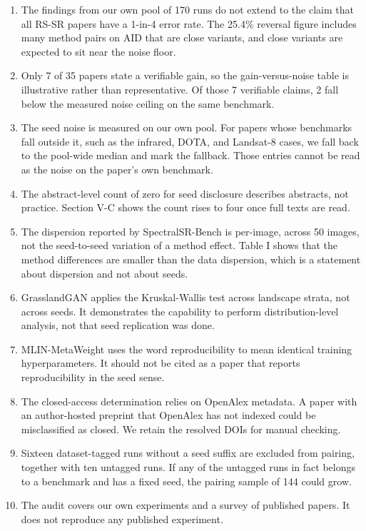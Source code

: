\documentclass[journal,twoside,10pt]{IEEEtran}
\begin{document}
\begin{enumerate}
\item The findings from our own pool of 170 runs do not extend to the claim that all RS-SR papers have a 1-in-4 error rate. The 25.4\% reversal figure includes many method pairs on AID that are close variants, and close variants are expected to sit near the noise floor.
\item Only 7 of 35 papers state a verifiable gain, so the gain-versus-noise table is illustrative rather than representative. Of those 7 verifiable claims, 2 fall below the measured noise ceiling on the same benchmark.
\item The seed noise is measured on our own pool. For papers whose benchmarks fall outside it, such as the infrared, DOTA, and Landsat-8 cases, we fall back to the pool-wide median and mark the fallback. Those entries cannot be read as the noise on the paper's own benchmark.
\item The abstract-level count of zero for seed disclosure describes abstracts, not practice. Section V-C shows the count rises to four once full texts are read.
\item The dispersion reported by SpectralSR-Bench is per-image, across 50 images, not the seed-to-seed variation of a method effect. Table I shows that the method differences are smaller than the data dispersion, which is a statement about dispersion and not about seeds.
\item GrasslandGAN applies the Kruskal-Wallis test across landscape strata, not across seeds. It demonstrates the capability to perform distribution-level analysis, not that seed replication was done.
\item MLIN-MetaWeight uses the word reproducibility to mean identical training hyperparameters. It should not be cited as a paper that reports reproducibility in the seed sense.
\item The closed-access determination relies on OpenAlex metadata. A paper with an author-hosted preprint that OpenAlex has not indexed could be misclassified as closed. We retain the resolved DOIs for manual checking.
\item Sixteen dataset-tagged runs without a seed suffix are excluded from pairing, together with ten untagged runs. If any of the untagged runs in fact belongs to a benchmark and has a fixed seed, the pairing sample of 144 could grow.
\item The audit covers our own experiments and a survey of published papers. It does not reproduce any published experiment.
\end{enumerate}
\end{document}
